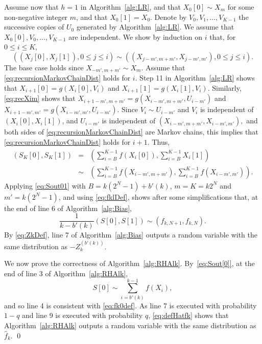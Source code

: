 \documentclass[a4paper,11pt]{article}
\begin{document}
Assume now that  \(h=1\) in Algorithm~\ref{alg:LR}, and that  \(X_{0}[0]\sim X_{m}\) for some non-negative integer \(m\), and that \(X_{0}[1]= X_{0}\).  Denote by \(V_{0},V_{1},\dots,V_{K-1}\)  the successive copies of \(U_{0}\) generated by Algorithm~\ref{alg:LR}. We assume that \(X_{0}[0],V_{0},\dots,V_{K-1}\) are independent. We show by induction on \(i\) that, for \(0\leq i\leq K\),
\begin{equation}\label{eq:recursionMarkovChainDist}
((X_{j}[0],X_{j}[1]),0\leq j\leq i)\sim((X_{j-m',m+m'},X_{j-m',m'}),0\leq j\leq i). 
\end{equation}
The base case holds since \(X_{-m',m+m'}\sim X_{m}\). Assume that \eqref{eq:recursionMarkovChainDist} holds for \(i\). Step 11 in Algorithm~\ref{alg:LR} shows that  \(X_{i+1}[0]= g(X_{i}[0],V_{i})\) and \(X_{i+1}[1]= g(X_{i}[1],V_{i})\). Similarly, \eqref{eq:recXim} shows that \(X_{i+1-m',m+m'}=g(X_{i-m',m+m'},U_{i-m'})\) and  \(X_{i+1-m',m'}=g(X_{i-m',m'},U_{i-m'})\).   Since \(V_{i}\sim U_{i-m'}\) and \(V_{i}\) is independent of \((X_{i}[0],X_{i}[1])\), and \(U_{i-m'}\) is independent of \((X_{i-m',m+m'},X_{i-m',m'}),\) and both sides of \eqref{eq:recursionMarkovChainDist} are Markov chains, this implies that  \eqref{eq:recursionMarkovChainDist} holds for \(i+1\).    Thus,\begin{eqnarray}\label{eq:Sout01}
(S_{K}[0],S_{K}[1])&=&(\sum ^{K-1}_{i=B}f(X_{i}[0]),\sum ^{K-1}_{i=B}X_{i}[1])\nonumber\\
&\sim&(\sum ^{K-1}_{i=B}f(X_{i-m',m+m'}),\sum ^{K-1}_{i=B}f(X_{i-m',m'})).
\end{eqnarray}   
Applying \eqref{eq:Sout01} with \(B=k(2^{N}-1)+b'(k)\),  \(m=K=k2^{N}\) and \(m'=k(2^{N}-1)\), and using \eqref{eq:fklDef}, shows after some simplifications  that, at the end of line 6 of Algorithm~\ref{alg:Bias}, \begin{equation*}
\frac{1}{k-b'(k)}(S[0],S[1])\sim(f_{k,N+1},f_{k,N}).
\end{equation*}
By \eqref{eq:ZkDef}, line 7 of Algorithm~\ref{alg:Bias} outputs a random variable with the same distribution as  \(-Z_{k}^{(b'(k))}\). 

We now prove the correctness of Algorithm~\ref{alg:RHAlk}. By~\eqref{eq:Sout[0]}, at the end of line 3 of Algorithm~\ref{alg:RHAlk}, \begin{equation*}
S[0]\sim\sum^{k-1}_{i=b'(k)}f(X_{i}),
\end{equation*} and so line 4 is consistent with \eqref{eq:fk0def}.
  As line 7 is executed with probability \(1-q\)
and line 9 is executed with probability \(q\), \eqref{eq:defHatfk} shows that Algorithm~\ref{alg:RHAlk} outputs a random variable with the same distribution as \(\hat f_{k}\).
\qed
\end{document}
